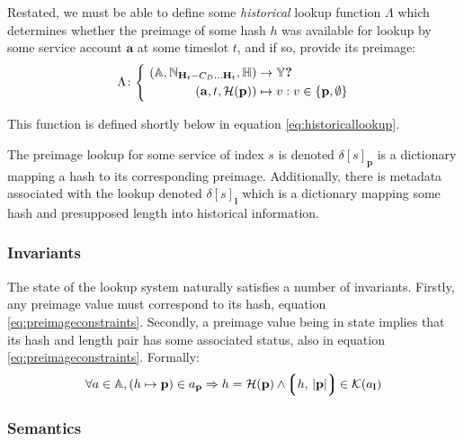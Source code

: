 Restated, we must be able to define some \emph{historical} lookup function $\Lambda$ which determines whether the preimage of some hash $h$ was available for lookup by some service account $\mathbf{a}$ at some timeslot $t$, and if so, provide its preimage:
\begin{equation}
\begin{aligned}
  \Lambda\colon \left\{\ \begin{aligned}
    (\mathbb{A}, \N_{\mathbf{H}_t - C_D\dots\mathbf{H}_t}, \mathbb{H}) &\to \mathbb{Y}\bm{?} \\
    (\mathbf{a}, t, \mathcal{H}(\mathbf{p})) &\mapsto v : v \in \{ \mathbf{p}, \none \}
  \end{aligned}\right.
\end{aligned}
\end{equation}

This function is defined shortly below in equation \ref{eq:historicallookup}.

The preimage lookup for some service of index $s$ is denoted $\delta[s]_\mathbf{p}$ is a dictionary mapping a hash to its corresponding preimage. Additionally, there is metadata associated with the lookup denoted $\delta[s]_\mathbf{l}$ which is a dictionary mapping some hash and presupposed length into historical information.

\subsubsection{Invariants}

The state of the lookup system naturally satisfies a number of invariants. Firstly, any preimage value must correspond to its hash, equation \ref{eq:preimageconstraints}. Secondly, a preimage value being in state implies that its hash and length pair has some associated status, also in equation \ref{eq:preimageconstraints}. Formally:
\begin{equation}\label{eq:preimageconstraints}
  \forall a \in \mathbb{A}, (h \mapsto \mathbf{p}) \in a_\mathbf{p} \Rightarrow
    h = \mathcal{H}(\mathbf{p})\wedge
    \tup{h \ts |\mathbf{p}|} \in \keys{a_\mathbf{l}}
\end{equation}

\subsubsection{Semantics}

